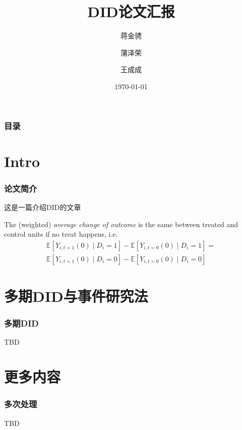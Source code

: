 \documentclass[
  UTF8,
  xcolor={dvipsnames,rgb},
  hyperref={colorlinks, citecolor=magenta, linkcolor=black},
  11pt
]{beamer}
\title{DID论文汇报}
\date{\today}
\author{蒋金骋 \and 蒲泽荣 \and 王成成}
\begin{document}
\begin{frame}
  \maketitle
\end{frame}

\begin{frame}
  \frametitle{目录}

  \tableofcontents

\end{frame}

\section{Intro}

\begin{frame}
  \frametitle{论文简介}

  这是一篇介绍DID的文章 \parencite{Baker.etal2025}

  \begin{assumption}
    The (weighted) \textit{average change of outcome} is the same between treated and control units if no treat happens, i.e.
    \begin{align*}
      \mathbb{E}[Y_{i,t=1}(0) \mid D_i=1] - \mathbb{E}[Y_{i,t=0}(0) \mid D_i=1] = \\
      \mathbb{E}[Y_{i,t=1}(0) \mid D_i=0] - \mathbb{E}[Y_{i,t=0}(0) \mid D_i=0]
    \end{align*}
  \end{assumption}

\end{frame}

\section{多期DID与事件研究法}

\begin{frame}
  \frametitle{多期DID}

  TBD

\end{frame}

\section{更多内容}

\begin{frame}
  \frametitle{多次处理}

  TBD

\end{frame}

\appendix

\begin{frame}[allowframebreaks]
  \printbibliography
\end{frame}
\end{document}
